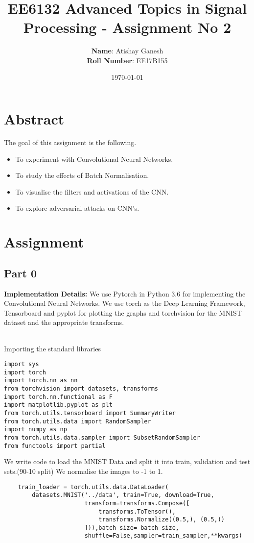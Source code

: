 \documentclass[11pt, a4paper]{article}
\title{EE6132 Advanced Topics in Signal Processing - Assignment No 2}
\author{
  \textbf{Name}: Atishay Ganesh\\
  \textbf{Roll Number}: EE17B155
}\date{\today}
\begin{document}
		
\maketitle 
\section{Abstract}
The goal of this assignment is the following.
\begin{itemize}
\item To experiment with Convolutional Neural Networks.
\item To study the effects of Batch Normalisation.
\item To visualise the filters and activations of the CNN.
\item To explore adversarial attacks on CNN's.
\end{itemize}

\section{Assignment}
\subsection{Part 0}
{\bf{Implementation Details:}}{
We use Pytorch in Python 3.6 for implementing the Convolutional Neural Networks. We use torch as the Deep Learning Framework, Tensorboard and pyplot for plotting the graphs and torchvision for the MNIST dataset and the appropriate transforms.
\\\\}

Importing the standard libraries
\begin{verbatim}
import sys
import torch
import torch.nn as nn
from torchvision import datasets, transforms
import torch.nn.functional as F
import matplotlib.pyplot as plt
from torch.utils.tensorboard import SummaryWriter
from torch.utils.data import RandomSampler
import numpy as np
from torch.utils.data.sampler import SubsetRandomSampler
from functools import partial
\end{verbatim}

We write code to load the MNIST Data and split it into train, validation and test sets.(90-10 split)
We normalise the images to -1 to 1.
\begin{verbatim}
    train_loader = torch.utils.data.DataLoader(
        datasets.MNIST('../data', train=True, download=True,
                       transform=transforms.Compose([
                           transforms.ToTensor(),
                           transforms.Normalize((0.5,), (0.5,))
                       ])),batch_size= batch_size, 
                       shuffle=False,sampler=train_sampler,**kwargs)


\end{verbatim}
\end{document}
